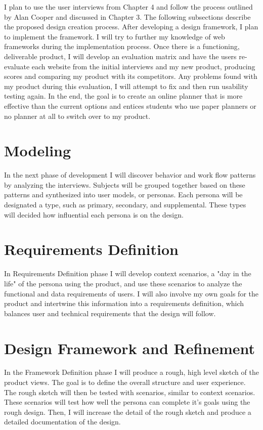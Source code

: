 %
%

I plan to use the user interviews from Chapter 4 and follow the process outlined by Alan Cooper and discussed in Chapter 3. The following subsections describe the proposed design creation process. After developing a design framework, I plan to implement the framework. I will try to further my knowledge of web frameworks during the implementation process. Once there is a functioning, deliverable product, I will develop an evaluation matrix and have the users re-evaluate each website from the initial interviews and my new product, producing scores and comparing my product with its competitors. Any problems found with my product during this evaluation, I will attempt to fix and then run usability testing again. In the end, the goal is to create an online planner that is more effective than the current options and entices students who use paper planners or no planner at all to switch over to my product.

\section{Modeling} 
In the next phase of development I will discover behavior and work flow patterns by analyzing the interviews. Subjects will be grouped together based on these patterns and synthesized into user models, or personas. Each persona will be designated a type, such as primary, secondary, and supplemental. These types will decided how influential each persona is on the design.

\section{Requirements Definition}
In Requirements Definition phase I will develop context scenarios, a "day in the life" of the persona using the product, and use these scenarios to analyze the functional and data requirements of users. I will also involve my own goals for the product and intertwine this information into a requirements definition, which balances user and technical requirements that the design will follow.

\section{Design Framework and Refinement}
In the Framework Definition phase I will produce a rough, high level sketch of the product views. The goal is to define the overall structure and user experience. The rough sketch will then be tested with scenarios, similar to context scenarios. These scenarios will test how well the persona can complete it's goals using the rough design. Then, I will increase the detail of the rough sketch and produce a detailed documentation of the design.